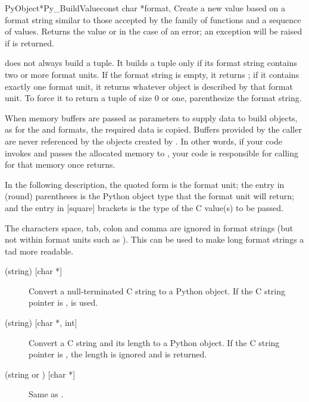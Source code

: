 \begin{cfuncdesc}{PyObject*}{Py_BuildValue}{const char *format,
                                            \moreargs}
  Create a new value based on a format string similar to those
  accepted by the  family of functions and a
  sequence of values.  Returns the value or \NULL{} in the case of an
  error; an exception will be raised if \NULL{} is returned.

   does not always build a tuple.  It
  builds a tuple only if its format string contains two or more format
  units.  If the format string is empty, it returns ; if it
  contains exactly one format unit, it returns whatever object is
  described by that format unit.  To force it to return a tuple of
  size 0 or one, parenthesize the format string.

  When memory buffers are passed as parameters to supply data to build
  objects, as for the  and  formats, the required
  data is copied.  Buffers provided by the caller are never referenced
  by the objects created by .  In other
  words, if your code invokes  and passes the
  allocated memory to , your code is
  responsible for calling  for that memory once
   returns.

  In the following description, the quoted form is the format unit;
  the entry in (round) parentheses is the Python object type that the
  format unit will return; and the entry in [square] brackets is the
  type of the C value(s) to be passed.

  The characters space, tab, colon and comma are ignored in format
  strings (but not within format units such as ).  This can
  be used to make long format strings a tad more readable.

  \begin{description}
    \item[ (string) {[char *]}]
    Convert a null-terminated C string to a Python object.  If the C
    string pointer is \NULL,  is used.

    \item[ (string) {[char *, int]}]
    Convert a C string and its length to a Python object.  If the C
    string pointer is \NULL, the length is ignored and  is
    returned.

    \item[ (string or ) {[char *]}]
    Same as .


\end{description}
\end{cfuncdesc}
